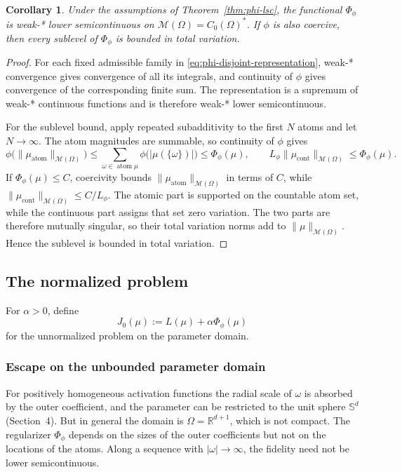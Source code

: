 \documentclass[11pt]{amsart}
\newtheorem{corollary}[theorem]{Corollary}
\theoremstyle{definition}
\theoremstyle{remark}
\DeclareMathOperator{\atom}{atom}
\DeclareMathOperator{\cont}{cont}
\begin{document}
\begin{corollary}
\label{cor:phi-lsc-sublevels}
Under the assumptions of Theorem~\ref{thm:phi-lsc}, the functional
$\Phi_\phi$ is weak-* lower semicontinuous on
$\mathcal M(\Omega)=C_0(\Omega)^*$. If $\phi$ is also coercive, then every
sublevel of $\Phi_\phi$ is bounded in total variation.
\end{corollary}
\begin{proof}
For each fixed admissible family in
\eqref{eq:phi-disjoint-representation}, weak-* convergence gives convergence
of all its integrals, and continuity of $\phi$ gives convergence of the
corresponding finite sum. The representation is a supremum of weak-*
continuous functions and is therefore weak-* lower semicontinuous.

For the sublevel bound, apply repeated subadditivity to the first $N$ atoms
and let $N\to\infty$. The atom magnitudes are summable, so continuity of
$\phi$ gives
\begin{equation*}
	\phi\bigl(\|\mu_{\atom}\|_{\mathcal M(\Omega)}\bigr)
	\le\sum_{\omega\in\atom\mu}
		\phi\bigl(|\mu(\{\omega\})|\bigr)
	\le\Phi_\phi(\mu),
	\qquad
	L_\phi\|\mu_{\cont}\|_{\mathcal M(\Omega)}
	\le\Phi_\phi(\mu).
\end{equation*}
If $\Phi_\phi(\mu)\le C$, coercivity bounds
$\|\mu_{\atom}\|_{\mathcal M(\Omega)}$ in terms of $C$, while
$\|\mu_{\cont}\|_{\mathcal M(\Omega)}\le C/L_\phi$. The atomic part is
supported on the countable atom set, while the continuous part assigns that
set zero variation. The two parts are therefore mutually singular, so their
total variation norms add to $\|\mu\|_{\mathcal M(\Omega)}$. Hence the
sublevel is bounded in total variation.
\end{proof}



\subsection{The normalized problem}
For $\alpha>0$, define
\begin{equation*}
	J_0(\mu):=L(\mu)+\alpha\Phi_\phi(\mu)
\end{equation*}
for the unnormalized problem on the parameter domain.


\subsubsection*{Escape on the unbounded parameter domain}
\label{sec:escape}
For positively homogeneous activation functions the radial scale of $\omega$ is absorbed by
the outer coefficient, and the parameter can be restricted to the unit sphere
$\mathbb{S}^d$ (Section~4). But in general the domain is
$\Omega = \mathbb{R}^{d+1}$, which is not compact.
The regularizer $\Phi_\phi$ depends on the sizes of the outer
coefficients but not on the locations of the atoms. Along a sequence with
$|\omega|\to\infty$, the fidelity need not be lower
semicontinuous.
\end{document}
